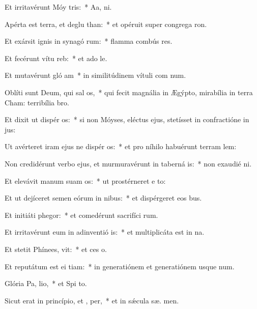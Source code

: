 \item Et irritavérunt Móy  tris:~* Aa,  ni.
\item Apérta est terra, et deglu than:~* et opéruit super congrega ron.
\item Et exársit ignis in synagó rum:~* flamma combús res.
\item Et fecérunt vítu  reb:~* et ado le.
\item Et mutavérunt gló am~* in similitúdinem vítuli com num.
\item Oblíti sunt Deum, qui sal os,~* qui fecit magnália in Ægýpto, mirabília in terra Cham: terribília   bro.
\item Et dixit ut dispér os:~* si non Móyses, eléctus ejus, stetísset in confractióne in  jus:
\item Ut avérteret iram ejus ne dispér os:~* et pro níhilo habuérunt terram lem:
\item Non credidérunt verbo ejus, et murmuravérunt in taberná is:~* non exaudié  ni.
\item Et elevávit manum suam  os:~* ut prostérneret e  to:
\item Et ut dejíceret semen eórum in nibus:~* et dispérgeret eos  bus.
\item Et initiáti  phegor:~* et comedérunt sacrifíci rum.
\item Et irritavérunt eum in adinventió is:~* et multiplicáta est in  na.
\item Et stetit Phínees,  vit:~* et ces o.
\item Et reputátum est ei  tiam:~* in generatiónem et generatiónem usque  num.
\item Glória Pa,  lio,~* et Spi to.
\item Sicut erat in princípio, et ,  per,~* et in sǽcula sæ. men.

